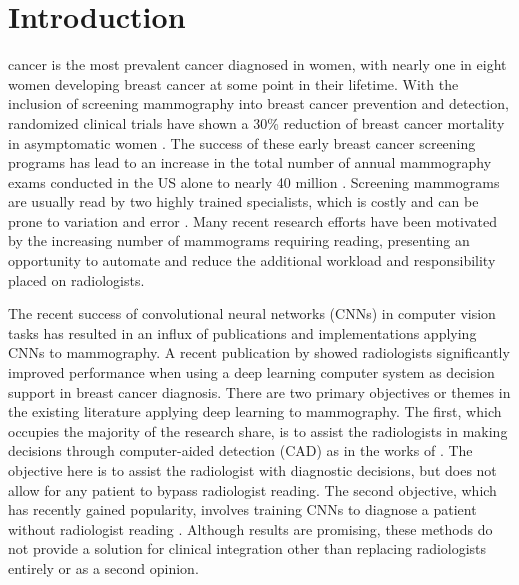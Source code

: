 \documentclass[journal]{IEEEtran}
\begin{document}
%
\IEEEpeerreviewmaketitle

\section{Introduction}
 cancer is the most prevalent cancer diagnosed in women, with nearly one in eight women developing breast cancer at some point in their lifetime.  
With the inclusion of screening mammography into breast cancer prevention and detection, randomized clinical trials have shown a 30\% reduction of breast cancer mortality in asymptomatic women \cite{duffy-2002}.  The success of these early breast cancer screening programs has lead to an increase in the total number of annual mammography exams conducted in the US alone to nearly 40 million \cite{broeders-2012}.  Screening mammograms are usually read by two highly trained specialists, which is costly and can be prone to variation and error \cite{kooi-2017}. Many recent research efforts \cite{ akselrod-2016,huynh-2016, qiu-2016,  samala-2016b,  abbas-2016, jiao-2016, shen-2017,becker-2016,kooi-2017,akselrod-2017,carneiro-2017,ribli-2017, mohamed-2018} have been motivated by the increasing number of mammograms requiring reading, presenting an opportunity to automate and reduce the additional workload and responsibility placed on radiologists.

The recent success of convolutional neural networks (CNNs) in computer vision tasks has resulted in an influx of publications and implementations applying CNNs to mammography.  A recent publication by \cite{karssemeijer-deeplearning} showed radiologists significantly improved performance when using a deep learning computer system as decision support in breast cancer diagnosis.  There are two primary objectives or themes in the existing literature applying deep learning to mammography.  The first, which occupies the majority of the research share, is to assist the radiologists in making decisions through computer-aided detection (CAD) as in the works of \cite{jamieson-2012, akselrod-2016,huynh-2016, kooi-2016, qiu-2016, samala-2016a, samala-2016b, dheeba-2014, abbas-2016, jiao-2016}.  The objective here is to assist the radiologist with diagnostic decisions, but does not allow for any patient to bypass radiologist reading.    The second objective, which has recently gained popularity, involves training CNNs to diagnose a patient without radiologist reading \cite{shen-2017,becker-2016,kooi-2017,akselrod-2017,carneiro-2017,ribli-2017, mohamed-2018}. Although results are promising, these methods do not provide a solution for clinical integration other than replacing radiologists entirely or as a second opinion. 
\end{document}
